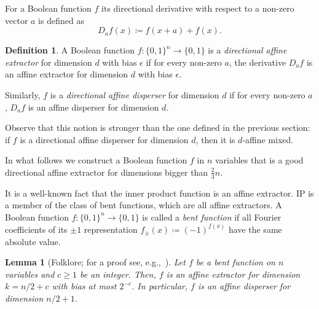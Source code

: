 \documentclass[10pt,a4paper]{article}
\newtheorem{lemma}[theorem]{Lemma}
\theoremstyle{definition}
\newtheorem{definition}[theorem]{Definition}
\theoremstyle{remark}
\newcommand{\Q}{{\{0,1\}}}
\begin{document}
For a Boolean function $f$ its directional derivative with respect to a non-zero vector $a$ is defined as
\[
  D_{a} f(x) \coloneqq f(x+a) + f(x).
\]

\begin{definition}
  A Boolean function $f\colon \Q^n \to \Q$ is a \emph{directional affine extractor} for dimension $d$ with bias $\epsilon$ if for every non-zero $a$, the derivative $D_a f$ is an affine extractor for dimension $d$ with bias $\epsilon$.

  Similarly, $f$ is a \emph{directional affine disperser} for dimension $d$ if for every non-zero $a$, $D_a f$ is an affine disperser for dimension $d$.
\end{definition}

Observe that this notion is stronger than the one defined in the previous section: if $f$ is a directional affine disperser for dimension $d$, then it is $d$-affine mixed. 

%
%
%

%
%
%
%
%
%
%
%
%
%
%

In what follows we construct a Boolean function $f$ in $n$ variables that is a good directional affine extractor for dimensions bigger than $\frac{2}{3}n$.


%
%
%
%

It is a well-known fact that the inner product function is an affine extractor. IP is a member of the class of bent functions, which are all affine extractors. A Boolean function $f\colon \Q^n \to \Q$ is called a \emph{bent function} if all Fourier coefficients of its $\pm 1$ representation $f_\pm(x) \coloneqq {(-1)}^{f(x)}$ have the same absolute value.
%
%

\begin{lemma}[Folklore; for a proof see, e.g.,~\cite{DBLP:conf/innovations/CohenS16,DBLP:journals/jcss/CheraghchiGJWX18}]
\label{lm:bent}
  Let $f$ be a bent function on $n$ variables and $c \ge 1$ be an integer. Then, $f$ is an affine extractor for dimension $k = n/2 + c$ with bias at most $2^{-c}$. In particular, $f$ is an affine disperser for dimension $n/2 + 1$.
\end{lemma}
\end{document}
